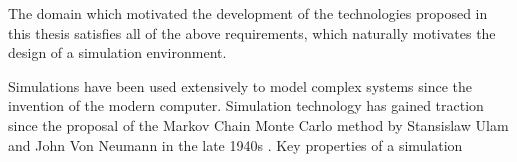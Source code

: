 






























The domain which motivated the development of the technologies proposed in this thesis satisfies all of the above requirements, which naturally motivates the design of a simulation environment. \par

Simulations have been used extensively to model complex systems since the invention of the modern computer. Simulation technology has gained traction since the proposal of the Markov Chain Monte Carlo method by Stansislaw Ulam and John Von Neumann in the late 1940s \cite{Robert2011AIncomplete}. Key properties of a simulation 

